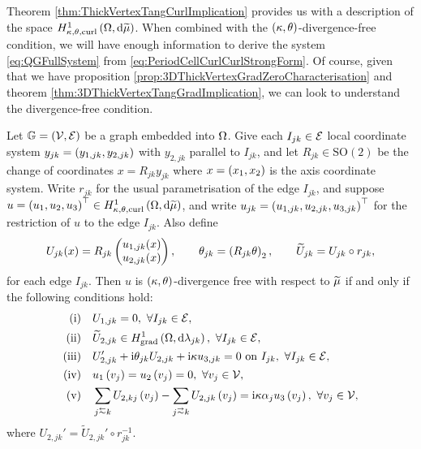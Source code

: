 Theorem \ref{thm:ThickVertexTangCurlImplication} provides us with a description of the space $H^1_{\kappa,\theta,\mathrm{curl}}\left( \Omega, \mathrm{d}\widetilde{\mu} \right)$.
When combined with the $\left( \kappa, \theta \right)$-divergence-free condition, we will have enough information to derive the system \eqref{eq:QGFullSystem} from \eqref{eq:PeriodCellCurlCurlStrongForm}.
Of course, given that we have proposition \ref{prop:3DThickVertexGradZeroCharacterisation} and theorem \ref{thm:3DThickVertexTangGradImplication}, we can look to understand the divergence-free condition.

\begin{prop} \label{prop:ThickVertexDivFree}
	Let $\mathbb{G}=\left( \mathcal{V}, \mathcal{E} \right)$ be a graph embedded into $\Omega$.
	Give each $I_{jk}\in\mathcal{E}$ local coordinate system $y_{jk}=\left( y_{1, jk},y_{2, jk} \right)$ with $y_{2,jk}$ parallel to $I_{jk}$, and let $R_{jk}\in\mathrm{SO}(2)$ be the change of coordinates $x=R_{jk}y_{jk}$ where $x=\left( x_1, x_2 \right)$ is the axis coordinate system.
	Write $r_{jk}$ for the usual parametrisation of the edge $I_{jk}$, and suppose $u=\left( u_1, u_2, u_3 \right)^\top\in H^1_{\kappa,\theta,\mathrm{curl}}\left( \Omega, \mathrm{d}\widetilde{\mu} \right)$, and write $u_{jk}=\left( u_{1,jk}, u_{2,jk}, u_{3,jk} \right)^\top$ for the restriction of $u$ to the edge $I_{jk}$.
	Also define
	\begin{align*}
		U_{jk}(x) = R_{jk}\begin{pmatrix} u_{1, jk}(x) \\ u_{2, jk}(x) \end{pmatrix},
		\qquad \theta_{jk} = \left(  R_{jk}\theta  \right)_2,
		\qquad \widetilde{U}_{jk} = U_{jk} \circ r_{jk},
	\end{align*}
	for each edge $I_{jk}$.
	Then $u$ is $\left( \kappa, \theta \right)$-divergence free with respect to $\widetilde{\mu}$ if and only if the following conditions hold:
	\begin{align*}
			\mathrm{(i)} \quad & U_{1, jk} = 0, \ \forall I_{jk}\in\edgeSet, \\
			\mathrm{(ii)} \quad & \widetilde{U}_{2,jk} \in\gradSob{\ddom}{\lambda_{jk}}, \ \forall I_{jk}\in\edgeSet, \\
			\mathrm{(iii)} \quad & U_{2,jk}' + \rmi\qm_{jk} U_{2,jk} + \rmi\wavenumber u_{3,jk} = 0 \text{ on } I_{jk}, \ \forall I_{jk}\in\edgeSet, \\
			\mathrm{(iv)} \quad & u_1\bracs{v_j} = u_2\bracs{v_j} = 0, \ \forall v_j\in\vertSet, \\
			\mathrm{(v)} \quad & \sum_{j\conRight k} U_{2,kj}\bracs{v_j} - \sum_{j\conLeft k} U_{2,jk}\bracs{v_j} = \rmi\wavenumber\alpha_j u_3\bracs{v_j}, \ \forall v_j\in\vertSet,
	\end{align*}
	where $U_{2,jk}' = \widetilde{U}_{2,jk}'\circ r_{jk}^{-1}$.
\end{prop}
